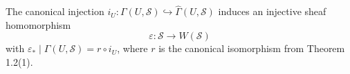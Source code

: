 The canonical injection $i_U : \Gamma(U, \mathcal{S}) \hookrightarrow \hat{\Gamma}(U, \mathcal{S})$ induces an injective sheaf homomorphism
$$
\varepsilon : \mathcal{S} \to W(\mathcal{S})
$$
with $\varepsilon_* \mid \Gamma(U, \mathcal{S}) = r \circ i_U$, where $r$ is the canonical isomorphism from Theorem 1.2(1).
